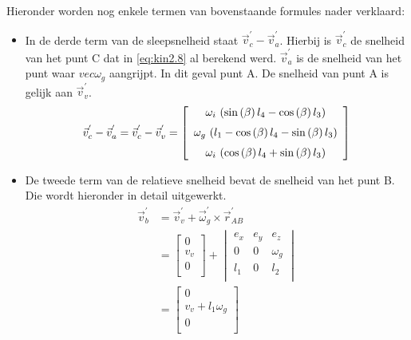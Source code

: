 Hieronder worden nog enkele termen van bovenstaande formules nader verklaard:
\begin{itemize}
\item In de derde term van de sleepsnelheid staat $\vec{v}_{c}^{'}-\vec{v}_{a}^{'}$. Hierbij is $\vec{v}_{c}^{'}$ de snelheid van het punt C dat in \eqref{eq:kin2.8} al berekend werd. $\vec{v}_{a}^{'}$ is de snelheid van het punt waar $vec{\omega}_{g}$ aangrijpt. In dit geval punt A. De snelheid van punt A is gelijk aan $\vec{v}_{v}^{'}$. 
\begin{equation}
\vec{v}_{c}^{'}-\vec{v}_{a}^{'}=\vec{v}_{c}^{'}-\vec{v}_{v}^{'}=
\left[ \begin {array}{c} \omega_{i}\, \left( \sin \left( \beta
 \right) l_{4}-\cos \left( \beta \right) l_{3} \right) 
\\ \noalign{\medskip}\omega_{g}\, \left( l_{1}-\cos \left( \beta
 \right) l_{4}-\sin \left( \beta \right) l_{3} \right) 
\\ \noalign{\medskip}\omega_{i}\, \left( \cos \left( \beta \right) l_{4}+\sin \left( \beta \right) l_{3} \right) \end {array} \right]
\label{eq:kin2.13}
\end{equation}
\item De tweede term van de relatieve snelheid bevat de snelheid van het punt B. Die wordt hieronder in detail uitgewerkt.
\begin{equation}
\begin{split}
\vec{v}_{b}^{'}&=\vec{v}_{v}^{'}+\vec{\omega}_{g}^{'}\times\vec{r}_{AB}^{'}\\
&=\begin{bmatrix}
0\\
v_{v}\\
0\\
\end{bmatrix}
+\begin{vmatrix}
e_{x}&e_{y}&e_{z}\\
0&0&\omega_{g}\\
l_{1}&0&l_{2}\\
\end{vmatrix}\\
&=\begin{bmatrix}
0\\
v_{v}+l_{1}\omega_{g}\\
0\\
\end{bmatrix}
\label{eq:kin2.14}
\end{split}
\end{equation}
\end{itemize}
